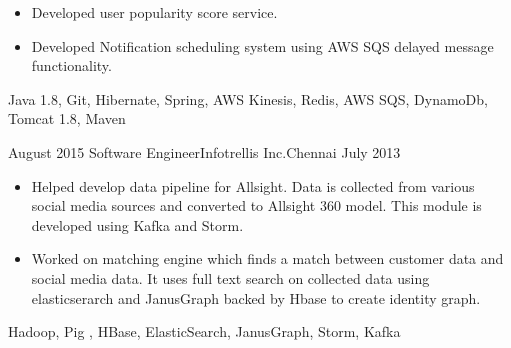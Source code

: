 \begin{experiences}
{\begin{itemize}
                        \item Developed user popularity score service.
                        
                        \item Developed Notification scheduling system using AWS SQS delayed message functionality.                         
                      \end{itemize}
                    }
                    {Java 1.8, Git, Hibernate, Spring, AWS Kinesis, Redis, AWS SQS, DynamoDb, Tomcat 1.8, Maven}

  \emptySeparator
  \experience
    {August 2015} {Software Engineer}{Infotrellis Inc.}{Chennai}
    {July 2013}    {
                      \begin{itemize}
                        \item Helped develop data pipeline for Allsight. Data is collected from various social media sources and converted to Allsight 360 model. This module is developed using Kafka and Storm.              
                        \item Worked on matching engine which finds a match between customer data and social media data. It uses full text search on collected data using elasticserarch and JanusGraph backed by Hbase to create identity graph. 
                      \end{itemize}
                    }
                    {Hadoop, Pig , HBase, ElasticSearch, JanusGraph, Storm, Kafka}
\end{experiences}
